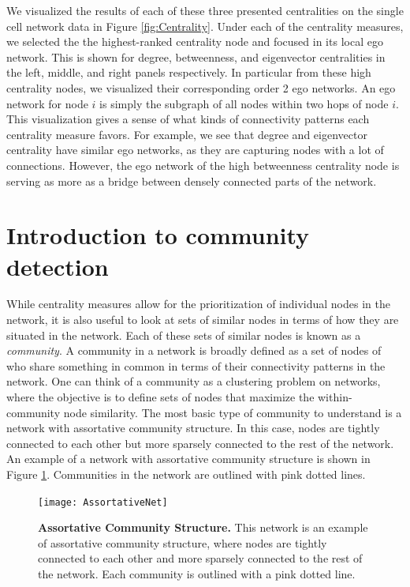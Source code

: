 \indent We visualized the results of each of these three presented centralities on the single cell network data in Figure \ref{fig:Centrality}. Under each of the centrality measures, we selected the the highest-ranked centrality node and focused in its local ego network. This is shown for degree, betweenness, and eigenvector centralities in the left, middle, and right panels respectively. In particular from these high centrality nodes, we visualized their corresponding order 2 ego networks.  An ego network for node $i$ is simply the subgraph of all nodes within two hops of node $i$. This visualization gives a sense of what kinds of connectivity patterns each centrality measure favors. For example, we see that degree and eigenvector centrality have similar ego networks, as they are capturing nodes with a lot of connections. However, the ego network of the high betweenness centrality node is serving as more as a bridge between densely connected parts of the network. 

\section{Introduction to community detection}
While centrality measures allow for the prioritization of individual nodes in the network, it is also useful to look at sets of similar nodes in terms of how they are situated in the network. Each of these sets of similar nodes is known as a \emph{community}. A community in a network is broadly defined as a set of nodes of who share something in common in terms of their connectivity patterns in the network. One can think of a community as a clustering problem on networks, where the objective is to define sets of nodes that maximize the within-community node similarity. The most basic type of community to understand is a network with assortative community structure. In this case, nodes are tightly connected to each other but more sparsely connected to the rest of the network. An example of a network with assortative community structure is shown in Figure \ref{fig:Assort}. Communities in the network are outlined with pink dotted lines.

 \begin{figure}
\begin{center}
\texttt{[image: AssortativeNet]}
\caption{{\bf Assortative Community Structure.} This network is an example of assortative community structure, where nodes are tightly connected to each other and more sparsely connected to the rest of the network. Each community is outlined with a pink dotted line.}
\label{fig:Assort}
\end{center}
\end{figure}

